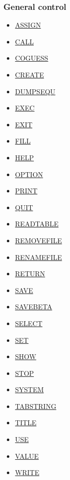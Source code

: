 \begin{itemize}
\subsubsection{General control}
\begin{itemize}
	\item \href{general.html#assign}{ASSIGN}
	\item \href{general.html#call}{CALL}
	\item \href{general.html#coguess}{COGUESS}
	\item \href{general.html#create}{CREATE}
	\item \href{general.html#dumpsequ}{DUMPSEQU}
	\item \href{general.html#exec}{EXEC}
	\item \href{general.html#exit}{EXIT}
	\item \href{general.html#fill}{FILL}
	\item \href{general.html#help}{HELP}
	\item \href{general.html#option}{OPTION}
	\item \href{general.html#print}{PRINT}
	\item \href{general.html#quit}{QUIT}
	\item \href{general.html#readtable}{READTABLE}
	\item \href{general.html#removefile}{REMOVEFILE}
	\item \href{general.html#renamefile}{RENAMEFILE}
	\item \href{general.html#return}{RETURN}
	\item \href{general.html#save}{SAVE}
	\item \href{general.html#savebeta}{SAVEBETA}
	\item \href{../Introduction/select.html}{SELECT}
	\item \href{../Introduction/set.html}{SET}
	\item \href{general.html#show}{SHOW}
	\item \href{general.html#stop}{STOP}
	\item \href{general.html#system}{SYSTEM}
	\item \href{general.html#tabstring}{TABSTRING}
	\item \href{general.html#title}{TITLE}
	\item \href{general.html#use}{USE}
	\item \href{general.html#value}{VALUE}
	\item \href{general.html#write}{WRITE}
\end{itemize}



\end{itemize}
